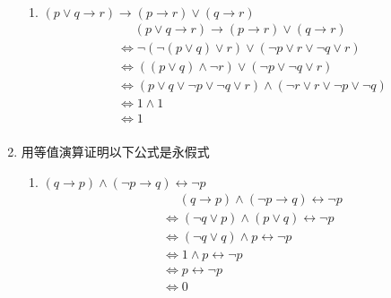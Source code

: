 \documentclass[UTF8]{ctexart}
\begin{document}
\begin{enumerate}
\begin{enumerate}
        
        \item  $( p \vee  q \rightarrow  r) \rightarrow  ( p \rightarrow  r) \vee  (q \rightarrow  r)$
        \[
            \begin{aligned}
                &\mathrel{\phantom{=}} (p\vee q \rightarrow r)\rightarrow (p\rightarrow r)\vee(q\rightarrow r)\\
                &\Leftrightarrow \neg(\neg (p\vee q)\vee r)\vee(\neg p \vee r \vee \neg q \vee r)\\
                &\Leftrightarrow ((p\vee q)\wedge \neg r) \vee (\neg p \vee \neg q \vee r)\\
                &\Leftrightarrow (p\vee q \vee \neg p \vee \neg q \vee r)\wedge(\neg r \vee r \vee \neg p \vee \neg q)\\
                &\Leftrightarrow 1\wedge 1\\
                &\Leftrightarrow 1\\
            \end{aligned}
        \]
    \end{enumerate}
    \item 用等值演算证明以下公式是永假式
    \begin{enumerate}
        \item $(q \rightarrow p) \wedge  (\neg p \rightarrow q) \leftrightarrow \neg p$
        \[
            \begin{aligned}
                &\mathrel{\phantom{=}}(q \rightarrow p) \wedge  (\neg p \rightarrow q) \leftrightarrow \neg p\\
                &\Leftrightarrow (\neg q \vee p)\wedge (p \vee q)\leftrightarrow \neg p\\
                &\Leftrightarrow (\neg q \vee q )\wedge p \leftrightarrow \neg p\\
                &\Leftrightarrow 1\wedge p \leftrightarrow \neg p\\
                &\Leftrightarrow p\leftrightarrow \neg p\\
                &\Leftrightarrow 0\\
            \end{aligned}
        \]
 


\end{enumerate}
\end{enumerate}
\end{document}
